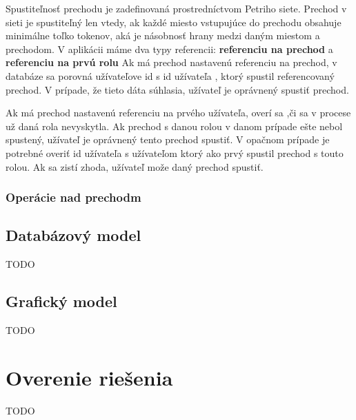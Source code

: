 	Spustiteľnosť prechodu je zadefinovaná prostredníctvom Petriho siete. Prechod v sieti je spustiteľný len vtedy, ak každé  miesto vstupujúce do prechodu obsahuje minimálne toľko tokenov, aká je násobnosť hrany medzi daným miestom a prechodom.
	V aplikácii máme dva typy referencii: \textbf{referenciu na prechod} a \textbf{referenciu na prvú rolu}
	Ak má prechod nastavenú referenciu na prechod, v databáze sa porovná užívateľove id s id užívateľa , ktorý spustil referencovaný prechod. V prípade, že tieto dáta súhlasia, užívateľ je oprávnený spustiť prechod.

	Ak má prechod nastavenú referenciu na prvého užívateľa, overí sa ,či sa v procese už daná rola nevyskytla. Ak prechod s danou rolou v danom prípade ešte nebol spustený, užívateľ je oprávnený tento prechod spustiť. V opačnom prípade je potrebné overiť id užívateľa s užívateľom ktorý ako prvý spustil prechod s touto rolou. Ak sa zistí zhoda, užívateľ može daný prechod spustiť.
	
	
			
	\subsubsection{Operácie nad prechodm}	
	
	
	
	\subsection{Databázový model}
	TODO
	\subsection{Grafický model}
	TODO

\section{Overenie riešenia}
TODO
	

